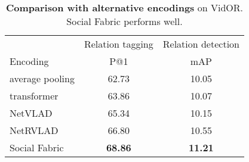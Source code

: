 \documentclass[10pt,twocolumn,letterpaper]{article}
\begin{document}
\begin{table}[t]
\centering
\begin{tabular}{lcc}
\toprule
& Relation tagging & Relation detection \\
\cmidrule(lr){2-2} \cmidrule(lr){3-3}
Encoding & P@1 & mAP \\
\midrule
average pooling & 62.73 & 10.05 \\
transformer & 63.86 & 10.07 \\
NetVLAD & 65.34 & 10.15 \\
NetRVLAD & 66.80 & 10.55 \\
\rowcolor{mygray} Social Fabric & \textbf{68.86} & \textbf{11.21} \\
\bottomrule
\end{tabular}
\caption{\textbf{Comparison with alternative encodings} on VidOR. Social Fabric performs well.
}
\label{tab:encodingcompare}
\end{table}
\end{document}

